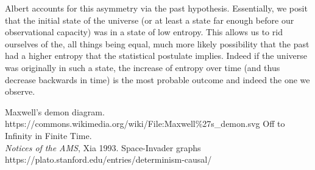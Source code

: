 \documentclass{article}
\begin{document}
Albert accounts for this asymmetry via the past hypothesis. Essentially, we posit that the initial state of the universe (or at least a state far enough before our observational capacity) was in a state of low entropy. This allows us to rid ourselves of the, all things being equal, much more likely possibility that the past had a higher entropy that the statistical postulate implies. Indeed if the universe was originally in such a state, the increase of entropy over time (and thus decrease backwards in time) is the most probable outcome and indeed the one we observe.

\vspace{10em}

\begin{thebibliography}{999}
      Maxwell's demon diagram.\\
      https://commons.wikimedia.org/wiki/File:Maxwell\%27s\_demon.svg
      Off to Infinity in Finite Time.\\
      \emph{Notices of the AMS}, Xia 1993.
      Space-Invader graphs\\
      https://plato.stanford.edu/entries/determinism-causal/
\end{thebibliography}
\end{document}
